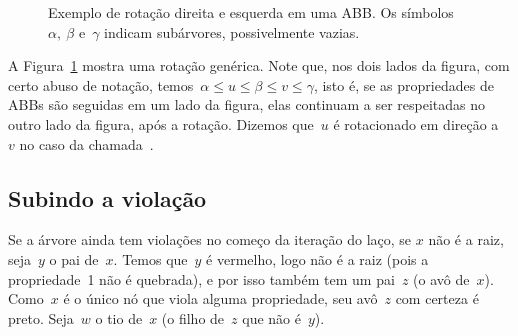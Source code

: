 \documentclass[main.tex]{subfiles}
\begin{document}
\begin{figure}
\centering
{}
\caption{Exemplo de rotação direita e esquerda em uma ABB. Os símbolos~$\alpha,~\beta$ e~$\gamma$ indicam subárvores, possivelmente vazias.} \label{fig:rot_ex}
\end{figure}

A Figura~\ref{fig:rot_ex} mostra uma rotação genérica. Note que, nos dois lados da figura, com certo abuso de notação, temos~${\alpha \leq u \leq \beta \leq v \leq \gamma}$, isto é, se as propriedades de ABBs são seguidas em um lado da figura, elas continuam a ser respeitadas no outro lado da figura, após a rotação. Dizemos que~$u$ é rotacionado em direção a~$v$ no caso da chamada~. %

\subsection{Subindo a violação}

Se a árvore ainda tem violações no começo da iteração do laço, se $x$ não é a raiz, seja~$y$ o pai de~$x$. Temos que~$y$ é vermelho, logo não é a raiz (pois a propriedade~1 não é quebrada), e por isso também tem um pai~$z$ (o avô de~$x$). Como~$x$ é o único nó que viola alguma propriedade, seu avô~$z$ com certeza é preto. Seja~$w$ o tio de~$x$ (o filho de~$z$ que não é~$y$).
\end{document}
